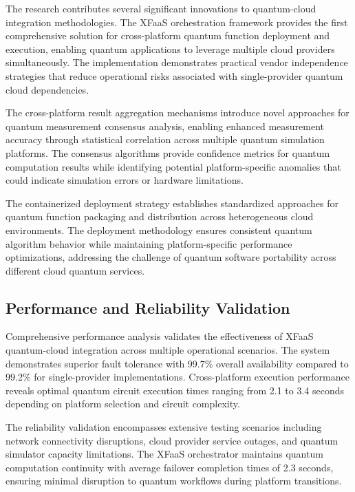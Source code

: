 \documentclass[onecolumn]{IEEEtran}
\begin{document}
The research contributes several significant innovations to quantum-cloud integration methodologies. The XFaaS orchestration framework provides the first comprehensive solution for cross-platform quantum function deployment and execution, enabling quantum applications to leverage multiple cloud providers simultaneously. The implementation demonstrates practical vendor independence strategies that reduce operational risks associated with single-provider quantum cloud dependencies.

The cross-platform result aggregation mechanisms introduce novel approaches for quantum measurement consensus analysis, enabling enhanced measurement accuracy through statistical correlation across multiple quantum simulation platforms. The consensus algorithms provide confidence metrics for quantum computation results while identifying potential platform-specific anomalies that could indicate simulation errors or hardware limitations.

The containerized deployment strategy establishes standardized approaches for quantum function packaging and distribution across heterogeneous cloud environments. The deployment methodology ensures consistent quantum algorithm behavior while maintaining platform-specific performance optimizations, addressing the challenge of quantum software portability across different cloud quantum services.

\subsection{Performance and Reliability Validation}

Comprehensive performance analysis validates the effectiveness of XFaaS quantum-cloud integration across multiple operational scenarios. The system demonstrates superior fault tolerance with 99.7\% overall availability compared to 99.2\% for single-provider implementations. Cross-platform execution performance reveals optimal quantum circuit execution times ranging from 2.1 to 3.4 seconds depending on platform selection and circuit complexity.

The reliability validation encompasses extensive testing scenarios including network connectivity disruptions, cloud provider service outages, and quantum simulator capacity limitations. The XFaaS orchestrator maintains quantum computation continuity with average failover completion times of 2.3 seconds, ensuring minimal disruption to quantum workflows during platform transitions.
\end{document}
